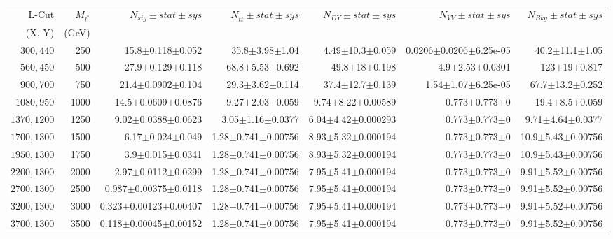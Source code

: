 \documentclass[]{article}
\begin{document}
\begin{table}
\begin{center}
\scriptsize{
\begin{tabular}{ |r|r|r|r|r|r|r|}
\hline 
L-Cut & $M_{l^*}$ & $N_{sig}\pm stat \pm sys $ &$N_{t\bar{t}}\pm stat \pm sys $ & $N_{DY}\pm stat \pm sys $ & $N_{VV}\pm stat \pm sys $ &$N_{Bkg}\pm stat \pm sys$\\
(X, Y) & (GeV) & && &&\\
\hline 
$300, 440$ & 250 & 15.8$\pm$0.118$\pm$0.052 & 35.8$\pm$3.98$\pm$1.04 & 4.49$\pm$10.3$\pm$0.059 & 0.0206$\pm$0.0206$\pm$6.25e-05 & 40.2$\pm$11.1$\pm$1.05 \\
$560, 450$ & 500 & 27.9$\pm$0.129$\pm$0.118 & 68.8$\pm$5.53$\pm$0.692 & 49.8$\pm$18$\pm$0.198 & 4.9$\pm$2.53$\pm$0.0301 & 123$\pm$19$\pm$0.817 \\
$900, 700$ & 750 & 21.4$\pm$0.0902$\pm$0.104 & 29.3$\pm$3.62$\pm$0.114 & 37.4$\pm$12.7$\pm$0.139 & 1.54$\pm$1.07$\pm$6.25e-05 & 67.7$\pm$13.2$\pm$0.252 \\
$1080,950$ & 1000 & 14.5$\pm$0.0609$\pm$0.0876 & 9.27$\pm$2.03$\pm$0.059 & 9.74$\pm$8.22$\pm$0.00589 & 0.773$\pm$0.773$\pm$0 & 19.4$\pm$8.5$\pm$0.059 \\
$1370,1200$ & 1250 & 9.02$\pm$0.0388$\pm$0.0623 & 3.05$\pm$1.16$\pm$0.0377 & 6.04$\pm$4.42$\pm$0.000293 & 0.773$\pm$0.773$\pm$0 & 9.71$\pm$4.64$\pm$0.0377 \\
$1700,1300$ & 1500 & 6.17$\pm$0.024$\pm$0.049 & 1.28$\pm$0.741$\pm$0.00756 & 8.93$\pm$5.32$\pm$0.000194 & 0.773$\pm$0.773$\pm$0 & 10.9$\pm$5.43$\pm$0.00756 \\
$1950,1300$ & 1750 & 3.9$\pm$0.015$\pm$0.0341 & 1.28$\pm$0.741$\pm$0.00756 & 8.93$\pm$5.32$\pm$0.000194 & 0.773$\pm$0.773$\pm$0 & 10.9$\pm$5.43$\pm$0.00756 \\
$2200,1300$ & 2000 & 2.97$\pm$0.0112$\pm$0.0299 & 1.28$\pm$0.741$\pm$0.00756 & 7.95$\pm$5.41$\pm$0.000194 & 0.773$\pm$0.773$\pm$0 & 9.91$\pm$5.52$\pm$0.00756 \\
$2700,1300$ & 2500 & 0.987$\pm$0.00375$\pm$0.0118 & 1.28$\pm$0.741$\pm$0.00756 & 7.95$\pm$5.41$\pm$0.000194 & 0.773$\pm$0.773$\pm$0 & 9.91$\pm$5.52$\pm$0.00756 \\
$3200,1300$ & 3000 & 0.323$\pm$0.00123$\pm$0.00407 & 1.28$\pm$0.741$\pm$0.00756 & 7.95$\pm$5.41$\pm$0.000194 & 0.773$\pm$0.773$\pm$0 & 9.91$\pm$5.52$\pm$0.00756 \\
$3700,1300$ & 3500 & 0.118$\pm$0.00045$\pm$0.00152 & 1.28$\pm$0.741$\pm$0.00756 & 7.95$\pm$5.41$\pm$0.000194 & 0.773$\pm$0.773$\pm$0 & 9.91$\pm$5.52$\pm$0.00756 \\

\end{tabular}}
\end{center}
\end{table}
\end{document}
